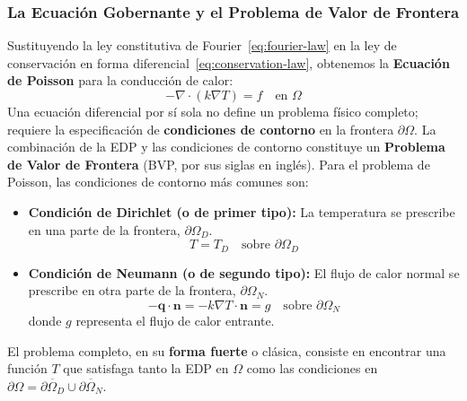 \subsubsection{La Ecuación Gobernante y el Problema de Valor de Frontera}
Sustituyendo la ley constitutiva de Fourier~\eqref{eq:fourier-law} en la ley de conservación en forma diferencial~\eqref{eq:conservation-law}, obtenemos la \textbf{Ecuación de Poisson} para la conducción de calor:
\begin{equation}
    -\nabla \cdot (k \nabla T) = f \quad \text{en } \Omega
    \label{eq:poisson-strong-bvp}
\end{equation}
Una ecuación diferencial por sí sola no define un problema físico completo; requiere la especificación de \textbf{condiciones de contorno} en la frontera \(\partial\Omega\). La combinación de la EDP y las condiciones de contorno constituye un \textbf{Problema de Valor de Frontera} (BVP, por sus siglas en inglés). Para el problema de Poisson, las condiciones de contorno más comunes son:
\begin{itemize}
    \item \textbf{Condición de Dirichlet (o de primer tipo):} La temperatura se prescribe en una parte de la frontera, \(\partial\Omega_D\).
    \[ T = T_D \quad \text{sobre } \partial\Omega_D \]
    \item \textbf{Condición de Neumann (o de segundo tipo):} El flujo de calor normal se prescribe en otra parte de la frontera, \(\partial\Omega_N\).
    \[ -\bm{q} \cdot \bm{n} = -k \nabla T \cdot \bm{n} = g \quad \text{sobre } \partial\Omega_N \]
    donde \(g\) representa el flujo de calor entrante.
\end{itemize}
El problema completo, en su \textbf{forma fuerte} o clásica, consiste en encontrar una función \(T\) que satisfaga tanto la EDP en \(\Omega\) como las condiciones en \(\partial\Omega = \overline{\partial\Omega_D} \cup \overline{\partial\Omega_N}\).
\bigskip

\noindent{}
\bigskip

